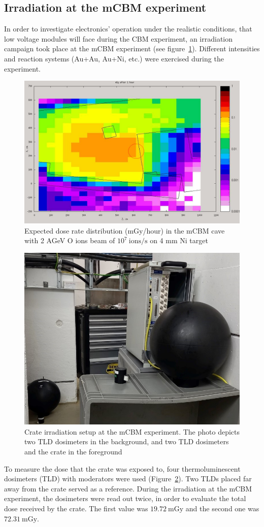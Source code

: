 \subsection{Irradiation at the mCBM experiment}
In order to investigate electronics' operation under the realistic conditions, that low voltage modules will face during the CBM experiment, an irradiation campaign took place at the mCBM experiment (see figure~\ref{fig:CBM1}). Different intensities and reaction systems (Au+Au, Au+Ni, etc.) were exercised during the experiment.
\begin{figure}[!h]
    \centering
    \includegraphics[width=0.55\columnwidth]{Chapter3/Irradiation/images/dose1.jpg}
    \caption{Expected dose rate distribution (mGy/hour) in the mCBM cave with 2 AGeV O ions beam of   $10^{7}\mathrm{\ ions/s}$ on 4 mm Ni target}
     \label{fig:CBM1}
\end{figure}
\begin{figure}[!h]
    \centering
    \includegraphics[width=0.4\columnwidth]{Chapter3/Irradiation/images/crate.jpg}
    \caption{Crate irradiation setup at the mCBM experiment. The photo depicts two TLD dosimeters in the background, and two TLD dosimeters and the crate in the foreground}
    \label{fig:crate}
\end{figure}
\newpage
To measure the dose that the crate was exposed to, four thermoluminescent dosimeters (\gls{TLD}) with moderators were used (Figure~\ref{fig:crate}). Two TLDs placed far away from the crate served as a reference. During the irradiation at the mCBM experiment, the dosimeters were read out twice, in order to evaluate the total dose received by the crate. The first value was $19.72\mathrm{\ mGy}$ and  the second one was $72.31\mathrm{\ mGy}$. 

